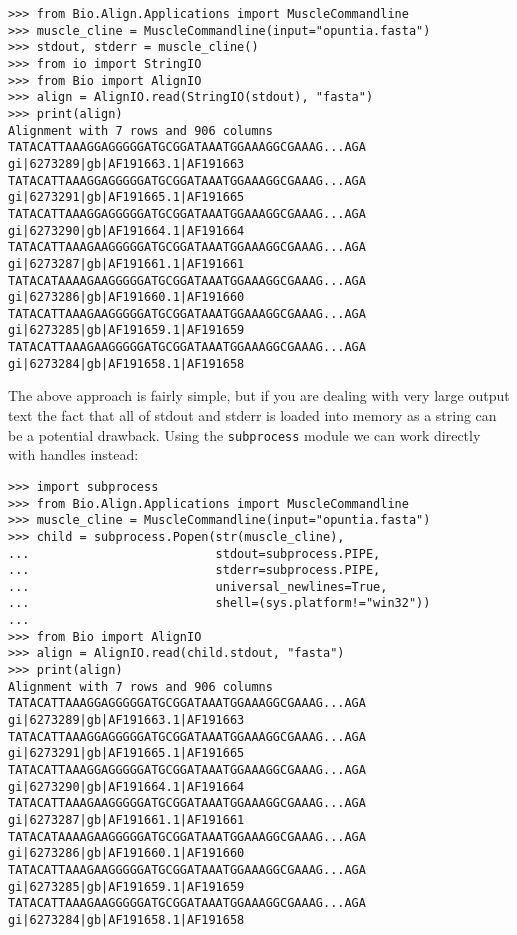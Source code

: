 \begin{verbatim}
>>> from Bio.Align.Applications import MuscleCommandline
>>> muscle_cline = MuscleCommandline(input="opuntia.fasta")
>>> stdout, stderr = muscle_cline()
>>> from io import StringIO
>>> from Bio import AlignIO
>>> align = AlignIO.read(StringIO(stdout), "fasta")
>>> print(align)
Alignment with 7 rows and 906 columns
TATACATTAAAGGAGGGGGATGCGGATAAATGGAAAGGCGAAAG...AGA gi|6273289|gb|AF191663.1|AF191663
TATACATTAAAGGAGGGGGATGCGGATAAATGGAAAGGCGAAAG...AGA gi|6273291|gb|AF191665.1|AF191665
TATACATTAAAGGAGGGGGATGCGGATAAATGGAAAGGCGAAAG...AGA gi|6273290|gb|AF191664.1|AF191664
TATACATTAAAGAAGGGGGATGCGGATAAATGGAAAGGCGAAAG...AGA gi|6273287|gb|AF191661.1|AF191661
TATACATAAAAGAAGGGGGATGCGGATAAATGGAAAGGCGAAAG...AGA gi|6273286|gb|AF191660.1|AF191660
TATACATTAAAGAAGGGGGATGCGGATAAATGGAAAGGCGAAAG...AGA gi|6273285|gb|AF191659.1|AF191659
TATACATTAAAGAAGGGGGATGCGGATAAATGGAAAGGCGAAAG...AGA gi|6273284|gb|AF191658.1|AF191658
\end{verbatim}

The above approach is fairly simple, but if you are dealing with very large output
text the fact that all of stdout and stderr is loaded into memory as a string can
be a potential drawback. Using the \verb|subprocess| module we can work directly
with handles instead:

\begin{verbatim}
>>> import subprocess
>>> from Bio.Align.Applications import MuscleCommandline
>>> muscle_cline = MuscleCommandline(input="opuntia.fasta")
>>> child = subprocess.Popen(str(muscle_cline),
...                          stdout=subprocess.PIPE,
...                          stderr=subprocess.PIPE,
...                          universal_newlines=True,
...                          shell=(sys.platform!="win32"))
...
>>> from Bio import AlignIO
>>> align = AlignIO.read(child.stdout, "fasta")
>>> print(align)
Alignment with 7 rows and 906 columns
TATACATTAAAGGAGGGGGATGCGGATAAATGGAAAGGCGAAAG...AGA gi|6273289|gb|AF191663.1|AF191663
TATACATTAAAGGAGGGGGATGCGGATAAATGGAAAGGCGAAAG...AGA gi|6273291|gb|AF191665.1|AF191665
TATACATTAAAGGAGGGGGATGCGGATAAATGGAAAGGCGAAAG...AGA gi|6273290|gb|AF191664.1|AF191664
TATACATTAAAGAAGGGGGATGCGGATAAATGGAAAGGCGAAAG...AGA gi|6273287|gb|AF191661.1|AF191661
TATACATAAAAGAAGGGGGATGCGGATAAATGGAAAGGCGAAAG...AGA gi|6273286|gb|AF191660.1|AF191660
TATACATTAAAGAAGGGGGATGCGGATAAATGGAAAGGCGAAAG...AGA gi|6273285|gb|AF191659.1|AF191659
TATACATTAAAGAAGGGGGATGCGGATAAATGGAAAGGCGAAAG...AGA gi|6273284|gb|AF191658.1|AF191658
\end{verbatim}

